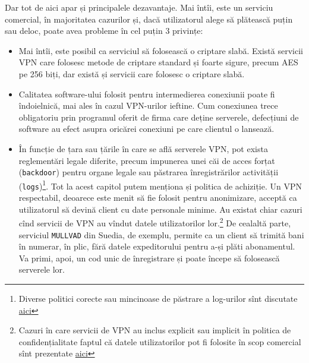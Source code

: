 Dar tot de aici apar și principalele dezavantaje. Mai întîi, este un serviciu
comercial, în majoritatea cazurilor și, dacă utilizatorul alege să plătească puțin
sau deloc, poate avea probleme în cel puțin 3 privințe:
\begin{itemize}
  \item Mai întîi, este posibil ca serviciul să folosească o criptare slabă. Există
    servicii VPN care folosesc metode de criptare standard și foarte sigure, precum
    AES pe 256 biți, dar există și servicii care folosesc o criptare slabă.
  \item Calitatea software-ului folosit pentru intermedierea conexiunii poate fi
    îndoielnică, mai ales în cazul VPN-urilor ieftine. Cum conexiunea trece obligatoriu
    prin programul oferit de firma care deține serverele, defecțiuni de software
    au efect asupra oricărei conexiuni pe care clientul o lansează.
  \item În funcție de țara sau țările în care se află serverele VPN, pot exista
    reglementări legale diferite, precum impunerea unei căi de acces forțat
    (\texttt{backdoor}) pentru organe legale sau păstrarea înregistrărilor activității
    (\texttt{logs})\footnote{Diverse politici corecte sau mincinoase de păstrare a
    log-urilor sînt discutate \href{https://thebestvpn.com/118-vpns-logging-policy/}{aici}}. 
    Tot la acest capitol putem menționa și politica de achiziție.
    Un VPN respectabil, deoarece este menit să fie folosit pentru anonimizare, acceptă
    ca utilizatorul să devină client cu date personale minime. Au existat chiar cazuri
    cînd servicii de VPN au vîndut datele utilizatorilor lor.\footnote{Cazuri în care
      servicii de VPN au inclus explicit sau implicit în politica de confidențialitate
      faptul că datele utilizatorilor pot fi folosite în scop comercial sînt
    prezentate \href{https://thebestvpn.com/how-free-vpns-sell-your-data/}{aici}}
    De cealaltă parte, serviciul \texttt{MULLVAD} din Suedia, de exemplu, permite ca 
    un client să trimită bani în numerar, în plic, fără datele expeditorului pentru 
    a-și plăti abonamentul. Va primi, apoi, un cod unic de înregistrare și poate 
    începe să folosească serverele lor.\footnotemark
\end{itemize}


